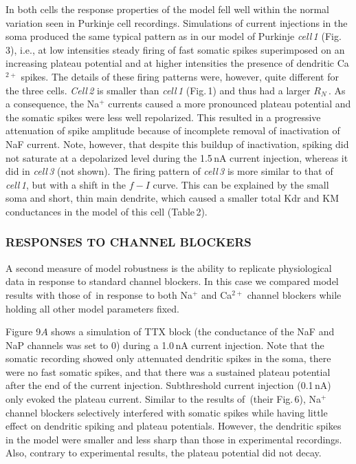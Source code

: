 \documentclass[12pt]{article}
\begin{document}
In both cells the response properties of the model fell well within the normal variation seen in Purkinje cell recordings. Simulations of current injections in the soma produced the same typical pattern as in our model of Purkinje {\it cell\,1} (Fig.\,3), i.e., at low intensities steady firing of fast somatic spikes superimposed on an increasing plateau potential and at higher intensities the presence of dendritic Ca$^{2+}$ spikes. The details of these firing patterns were, however, quite different for the three cells. {\it Cell\,2} is smaller than {\it cell\,1} (Fig.\,1) and thus had a larger $R_N$\,\cite{Rapp-P:1994qf}. As a consequence, the Na$^+$ currents caused a more pronounced plateau potential and the somatic spikes were less well repolarized. This resulted in a progressive attenuation of spike amplitude because of incomplete removal of inactivation of NaF current. Note, however, that despite this buildup of inactivation, spiking did not saturate at a depolarized level during the 1.5\,nA current injection, whereas it did in {\it cell\,3} (not shown). The firing pattern of {\it cell\,3} is more similar to that of {\it cell\,1}, but with a shift in the $f-I$ curve. This can be explained by the small soma and short, thin main dendrite, which caused a smaller total Kdr and KM conductances in the model of this cell (Table\,2).

\subsubsection*{RESPONSES TO CHANNEL BLOCKERS}

A second measure of model robustness is the ability to replicate physiological data in response to standard channel blockers. In this case we compared model results with those of\,\cite{R:1980ly} in response to both Na$^+$ and Ca$^{2+}$ channel blockers while holding all other model parameters fixed.

Figure 9$A$ shows a simulation of TTX block (the conductance of the NaF and NaP channels was set to 0) during a 1.0\,nA current injection. Note that the somatic recording showed only attenuated dendritic spikes in the soma, there were no fast somatic spikes, and that there was a sustained plateau potential after the end of the current injection. Subthreshold current injection (0.1\,nA) only evoked the plateau current. Similar to the results of\,\cite{R:1980ly} (their Fig.\,6), Na$^+$ channel blockers selectively interfered with somatic spikes while having little effect on dendritic spiking and plateau potentials. However, the dendritic spikes in the model were smaller and less sharp than those in experimental recordings. Also, contrary to experimental results, the plateau potential did not decay.
\end{document}
